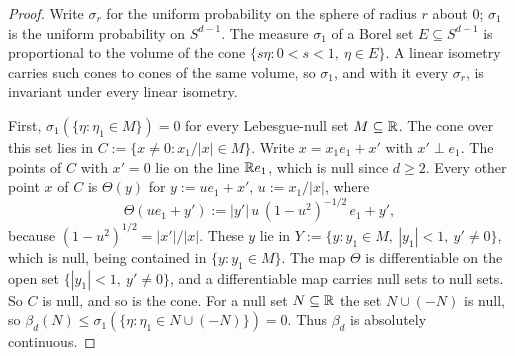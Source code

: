 \begin{proof}
\leanok
Write $\sigma_r$ for the uniform probability on the sphere of radius $r$ about $0$; $\sigma_1$ is
the uniform probability on $S^{d-1}$. The measure $\sigma_1$ of a Borel set $E \subseteq S^{d-1}$ is proportional
to the volume of the cone $\{s\eta : 0 < s < 1,\ \eta \in E\}$. A linear isometry carries such cones
to cones of the same volume, so $\sigma_1$, and with it every $\sigma_r$, is invariant under every
linear isometry.

First, $\sigma_1(\{\eta : \eta_1 \in M\}) = 0$ for every Lebesgue-null set $M \subseteq \mathbb{R}$. The cone
over this set lies in $C := \{x \ne 0 : x_1/|x| \in M\}$. Write $x = x_1e_1 + x'$ with $x' \perp e_1$.
The points of $C$ with $x' = 0$ lie on the line $\mathbb{R} e_1$, which is null since $d \ge 2$. Every other
point $x$ of $C$ is $\Theta(y)$ for $y := ue_1 + x'$, $u := x_1/|x|$, where
\[
  \Theta(ue_1 + y') := |y'|\,u\,(1 - u^2)^{-1/2}\,e_1 + y' ,
\]
because $(1 - u^2)^{1/2} = |x'|/|x|$. These $y$ lie in $Y := \{y : y_1 \in M,\ |y_1| < 1,\ y' \ne 0\}$,
which is null, being contained in $\{y : y_1 \in M\}$. The map $\Theta$ is differentiable on the open
set $\{|y_1| < 1,\ y' \ne 0\}$, and a differentiable map carries null sets to null sets. So $C$ is
null, and so is the cone. For a null set $N \subseteq \mathbb{R}$ the set $N \cup (-N)$ is null, so
$\beta_d(N) \le \sigma_1(\{\eta : \eta_1 \in N \cup (-N)\}) = 0$. Thus $\beta_d$ is absolutely
continuous.


\end{proof}
